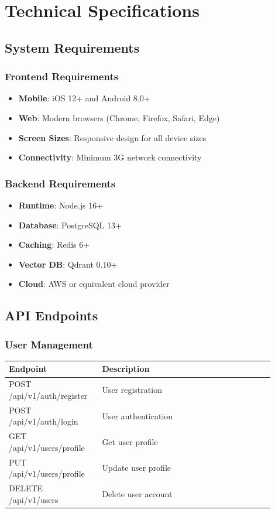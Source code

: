 \documentclass[12pt,a4paper]{report}
\begin{document}
\appendix
\chapter{Technical Specifications}
\section{System Requirements}
\subsection{Frontend Requirements}
\begin{itemize}[leftmargin=2em]
  \item \textbf{Mobile}: iOS 12+ and Android 8.0+
  \item \textbf{Web}: Modern browsers (Chrome, Firefox, Safari, Edge)
  \item \textbf{Screen Sizes}: Responsive design for all device sizes
  \item \textbf{Connectivity}: Minimum 3G network connectivity
\end{itemize}

\subsection{Backend Requirements}
\begin{itemize}[leftmargin=2em]
  \item \textbf{Runtime}: Node.js 16+
  \item \textbf{Database}: PostgreSQL 13+
  \item \textbf{Caching}: Redis 6+
  \item \textbf{Vector DB}: Qdrant 0.10+
  \item \textbf{Cloud}: AWS or equivalent cloud provider
\end{itemize}

\section{API Endpoints}
\subsection{User Management}
\begin{longtable}{p{0.3\linewidth} p{0.6\linewidth}}
\toprule
\textbf{Endpoint} & \textbf{Description}\\
\midrule
POST /api/v1/auth/register & User registration\\
POST /api/v1/auth/login & User authentication\\
GET /api/v1/users/profile & Get user profile\\
PUT /api/v1/users/profile & Update user profile\\
DELETE /api/v1/users & Delete user account\\
\bottomrule
\end{longtable}
\end{document}
